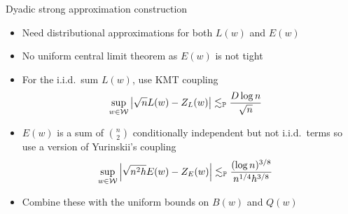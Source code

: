 \documentclass{beamer}
\begin{document}
\begin{frame}{Dyadic strong approximation construction}

  \begin{itemize}
    \item Need distributional approximations for both $L(w)$ and $E(w)$
    \item No uniform central limit theorem as $E(w)$ is not tight
    \item For the i.i.d.\ sum $L(w)$, use KMT coupling
      \citep{komlos1975approximation}
      \begin{align*}
        \sup_{w \in \mathcal{W}} \left|\sqrt n L(w) - Z_L(w)\right|
        &\lesssim_{\mathbb{P}}
        \frac{D \log n}{\sqrt n}
      \end{align*}
    \item $E(w)$ is a sum of $\binom{n}{2}$
      conditionally independent but not i.i.d.\ terms
      so use a version of Yurinskii's coupling
      \citep{yurinskii1978error}
      \begin{align*}
        \sup_{w \in \mathcal{W}} \left|\sqrt{n^2 h} E(w) - Z_E(w)\right|
        &\lesssim_{\mathbb{P}}
        \frac{(\log n)^{3/8}}{n^{1/4} h^{3/8}}
      \end{align*}
    \item Combine these with the uniform bounds on $B(w)$ and $Q(w)$
  \end{itemize}

\end{frame}
\end{document}
